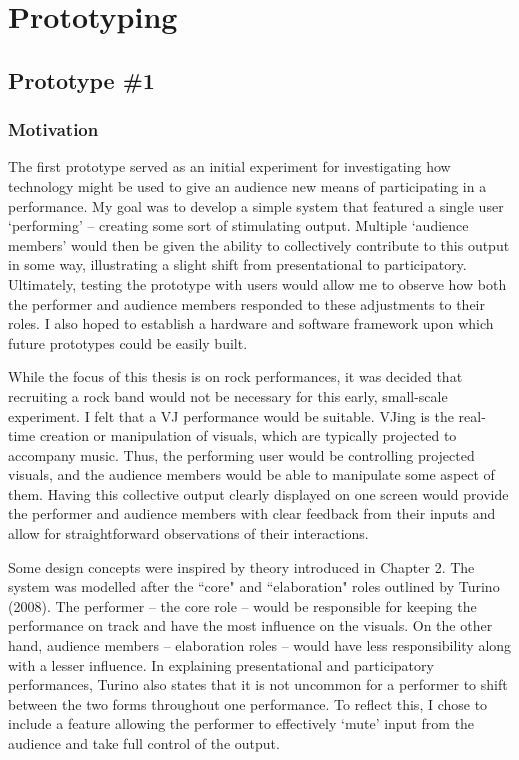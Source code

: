 \chapter{Prototyping}

\section{Prototype \#1}

\subsection{Motivation}

The first prototype served as an initial experiment for investigating how technology might be used to give an audience new means of participating in a performance. My goal was to develop a simple system that featured a single user `performing' -- creating some sort of stimulating output. Multiple `audience members' would then be given the ability to collectively contribute to this output in some way, illustrating a slight shift from presentational to participatory. Ultimately, testing the prototype with users would allow me to observe how both the performer and audience members responded to these adjustments to their roles. I also hoped to establish a hardware and software framework upon which future prototypes could be easily built.

While the focus of this thesis is on rock performances, it was decided that recruiting a rock band would not be necessary for this early, small-scale experiment. I felt that a VJ performance would be suitable. VJing is the real-time creation or manipulation of visuals, which are typically projected to accompany music. Thus, the performing user would be controlling projected visuals, and the audience members would be able to manipulate some aspect of them. Having this collective output clearly displayed on one screen would provide the performer and audience members with clear feedback from their inputs and allow for straightforward observations of their interactions.

Some design concepts were inspired by theory introduced in Chapter 2. The system was modelled after the ``core" and ``elaboration" roles outlined by Turino (2008). The performer -- the core role -- would be responsible for keeping the performance on track and have the most influence on the visuals. On the other hand, audience members -- elaboration roles -- would have less responsibility along with a lesser influence. In explaining presentational and participatory performances, Turino also states that it is not uncommon for a performer to shift between the two forms throughout one performance. To reflect this, I chose to include a feature allowing the performer to effectively `mute' input from the audience and take full control of the output.


